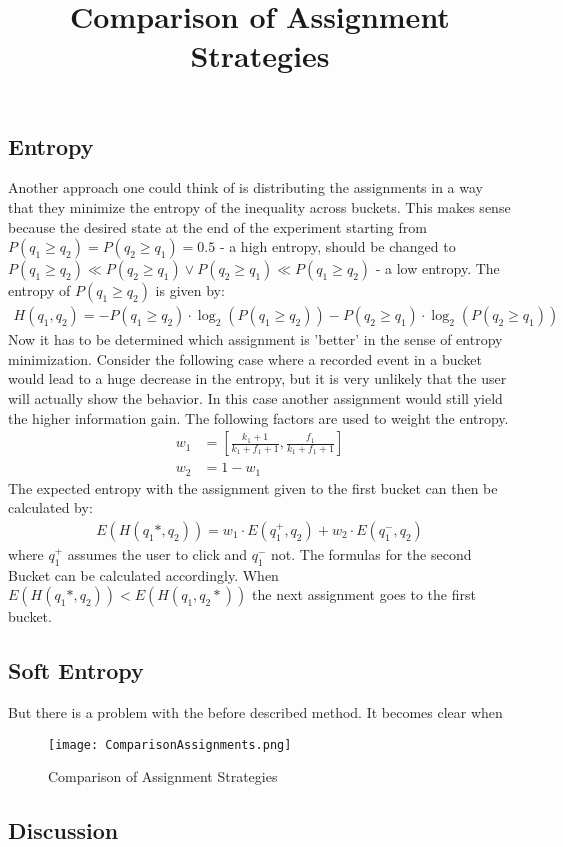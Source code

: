 \documentclass[../Thesis.tex]{subfiles}
\begin{document}
\subsection{Entropy}
Another approach one could think of is distributing the assignments in a way that they minimize the entropy of the inequality across buckets. This makes sense because the desired state at the end of the experiment starting from $P(q_1\geq q_2)=P(q_2\geq q_1)=0.5$ - a high entropy, should be changed to $P(q_1\geq q_2)\ll P(q_2\geq q_1) \lor P(q_2\geq q_1)\ll P(q_1\geq q_2)$ - a low entropy. The entropy of $P(q_1\geq q_2)$ is given by:
\begin{align*}
H(q_1,q_2) 	= - P(q_1\geq q_2) \cdot \log_2(P(q_1\geq q_2)) - P(q_2\geq q_1) \cdot \log_2(P(q_2\geq q_1))
\end{align*}
Now it has to be determined which assignment is 'better' in the sense of entropy minimization. Consider the following case where a recorded event in a bucket would lead to a huge decrease in the entropy, but it is very unlikely that the user will actually show the behavior. In this case another assignment would still yield the higher information gain. The following factors are used to weight the entropy.
\begin{align*}
w_1 &=[\frac{k_1+1}{k_1+f_1+1},\frac{f_1}{k_1+f_1+1}] \\
w_2 &=1 - w_1
\end{align*}
The expected entropy with the assignment given to the first bucket can then be calculated by:
\begin{align*}
E(H(q_1*,q_2)) = w_1\cdot E(q_1^+,q_2) + w_2\cdot E(q_1^-,q_2)
\end{align*}
where $q_1^+$ assumes the user to click and $q_1^-$ not. The formulas for the second Bucket can be calculated accordingly. When $E(H(q_1*,q_2)) < E(H(q_1,q_2*))$ the next assignment goes to the first bucket.
\subsection{Soft Entropy}
But there is a problem with the before described method. It becomes clear when 
\begin{figure}[ht]
\texttt{[image: ComparisonAssignments.png]}
\centering
\title{Comparison of Assignment Strategies}
\caption{Comparison of Assignment Strategies}
\end{figure}
\subsection{Discussion}
\end{document}
